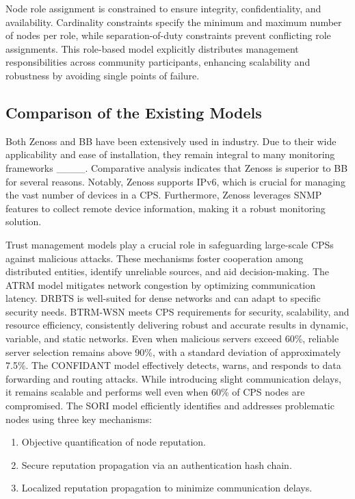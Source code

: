 Node role assignment is constrained to ensure integrity, confidentiality, and availability. Cardinality constraints specify the minimum and maximum number of nodes per role, while separation-of-duty constraints prevent conflicting role assignments. This role-based model explicitly distributes management responsibilities across community participants, enhancing scalability and robustness by avoiding single points of failure.

\subsection{Comparison of the Existing Models}
Both Zenoss and BB have been extensively used in industry. Due to their wide applicability and ease of installation, they remain integral to many monitoring frameworks ____. Comparative analysis indicates that Zenoss is superior to BB for several reasons. Notably, Zenoss supports IPv6, which is crucial for managing the vast number of devices in a CPS. Furthermore, Zenoss leverages SNMP features to collect remote device information, making it a robust monitoring solution.

Trust management models play a crucial role in safeguarding large-scale CPSs against malicious attacks. These mechanisms foster cooperation among distributed entities, identify unreliable sources, and aid decision-making. The ATRM model mitigates network congestion by optimizing communication latency. DRBTS is well-suited for dense networks and can adapt to specific security needs. BTRM-WSN meets CPS requirements for security, scalability, and resource efficiency, consistently delivering robust and accurate results in dynamic, variable, and static networks. Even when malicious servers exceed 60\%, reliable server selection remains above 90\%, with a standard deviation of approximately 7.5\%. The CONFIDANT model effectively detects, warns, and responds to data forwarding and routing attacks. While introducing slight communication delays, it remains scalable and performs well even when 60\% of CPS nodes are compromised. The SORI model efficiently identifies and addresses problematic nodes using three key mechanisms:

\begin{enumerate}
 \item Objective quantification of node reputation.
 \item Secure reputation propagation via an authentication hash chain.
 \item Localized reputation propagation to minimize communication delays.
\end{enumerate}

